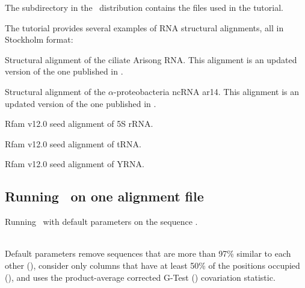 The subdirectory  in the \rscape\ distribution contains the
files used in the tutorial. 

The tutorial provides several examples of RNA structural
alignments, all in Stockholm format:

\begin{sreitems}{}
\item[\emprog{updated\_arisong.sto}] Structural alignment of the ciliate
  Arisong RNA. This alignment is an updated
  version of the one published in \citep{JungEddy11}.
\item[\emprog{ar14.sto}] Structural alignment of the $\alpha$-proteobacteria ncRNA ar14. This alignment is an updated version of the one
  published in \citep{delVal12}.
\item[\emprog{RF00001.sto}] Rfam v12.0 seed alignment of 5S rRNA. 
\item[\emprog{RF00005.sto}] Rfam v12.0 seed alignment of tRNA. 
\item[\emprog{RF00001.sto}] Rfam v12.0 seed alignment of YRNA. 
\end{sreitems}


\subsection{Running \rscape\, on one alignment file}
Running \rscape\, with default parameters on the sequence
.

\\
Default parameters remove sequences that are more than 97\% similar to
each other (), consider only columns that have at least
50\% of the positions occupied (), and uses the
product-average corrected G-Test () covariation
statistic.

